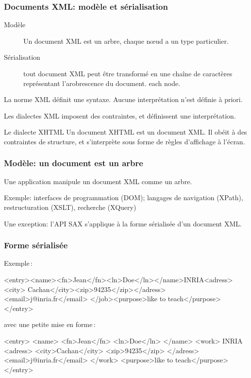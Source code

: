 \begin{frame}
\frametitle{Documents XML: modèle et sérialisation}

\begin{description}

\item [Modèle] Un document XML est un arbre, chaque n{\oe}ud a un type particulier.

\item [Sérialisation] tout document XML peut être transformé en une chaîne
   de caractères représentant l'arobrescence du document.
 each node.

\end{description}

La norme XML définit une \alert{syntaxe}. Aucune interprétation n'est
définie à priori.

\vfill

Les dialectes XML imposent des contraintes, et définissent une interprétation.


\begin{beamerboxesrounded}{Le dialecte XHTML}
Un document XHTML est un document XML. Il obéit à des contraintes de structure, et s'interprète
sous forme de règles d'affichage à l'écran.
\end{beamerboxesrounded}

\end{frame}

\begin{frame}
\frametitle{Modèle: un document est un arbre}

Une application manipule un document XML comme un arbre.


Exemple: interfaces de programmation (DOM); langages de navigation (XPath),
restructuration (XSLT), recherche (XQuery)
\begin{remark}
Une exception: l'API SAX s'applique à la forme sérialisée d'un document XML.
\end{remark}

\end{frame}

\begin{frame}[fragile]
\frametitle{Forme sérialisée}

Exemple\,:

\begin{tinyverbatim}
<entry><name><fn>Jean</fn><ln>Doe</ln></name>INRIA<adress><city>
Cachan</city><zip>94235</zip></adress><email>j@inria.fr</email>
</job><purpose>like to teach</purpose></entry>
\end{tinyverbatim}
avec une petite mise en forme\,:
\begin{tinyverbatim}
<entry>
   <name>
      <fn>Jean</fn>
      <ln>Doe</ln> </name>
   <work>
      INRIA
      <adress>
         <city>Cachan</city>
         <zip>94235</zip> </adress>
      <email>j@inria.fr</email> </work>
   <purpose>like to teach</purpose>
</entry>
\end{tinyverbatim}
\end{frame}

